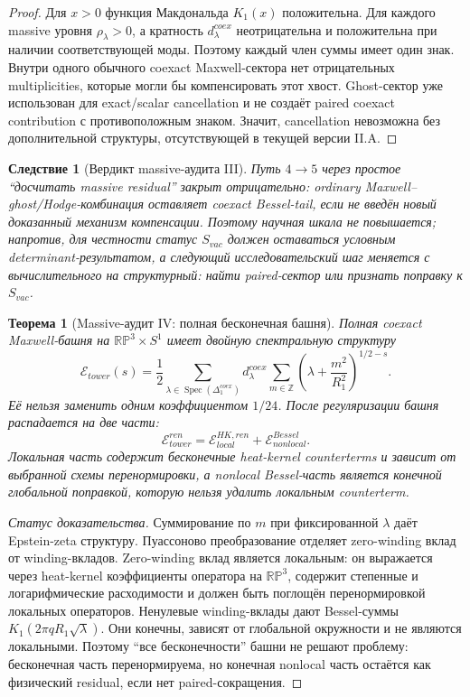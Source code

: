 \documentclass[12pt,a4paper]{report}
\newtheorem{theorem}{Теорема}[chapter]
\newtheorem{corollary}{Следствие}[chapter]
\theoremstyle{remark}
\DeclareMathOperator{\Spec}{Spec}
\begin{document}
\begin{proof}
Для \(x>0\) функция Макдональда \(K_1(x)\) положительна. Для каждого massive уровня \(\rho_{\lambda}>0\), а кратность \(d^{coex}_{\lambda}\) неотрицательна и положительна при наличии соответствующей моды. Поэтому каждый член суммы имеет один знак. Внутри одного обычного coexact Maxwell-сектора нет отрицательных multiplicities, которые могли бы компенсировать этот хвост. Ghost-сектор уже использован для exact/scalar cancellation и не создаёт paired coexact contribution с противоположным знаком. Значит, cancellation невозможна без дополнительной структуры, отсутствующей в текущей версии II.A.
\end{proof}

\begin{corollary}[Вердикт massive-аудита III]
Путь \(4\to5\) через простое ``досчитать massive residual'' закрыт отрицательно: ordinary Maxwell--ghost/Hodge-комбинация оставляет coexact Bessel-tail, если не введён новый доказанный механизм компенсации. Поэтому научная шкала не повышается; напротив, для честности статус \(S_{vac}\) должен оставаться условным determinant-результатом, а следующий исследовательский шаг меняется с вычислительного на структурный: найти paired-сектор или признать поправку к \(S_{vac}\).
\end{corollary}


\begin{theorem}[Massive-аудит IV: полная бесконечная башня]
Полная coexact Maxwell-башня на \(\mathbb{RP}^3\times S^1\) имеет двойную спектральную структуру
\begin{equation}
    \mathcal{E}_{tower}(s)=
    \frac12\sum_{\lambda\in\Spec(\Delta_1^{coex})}
    d^{coex}_{\lambda}
    \sum_{m\in\mathbb{Z}}
    \left(\lambda+\frac{m^2}{R_1^2}\right)^{1/2-s}.
\end{equation}
Её нельзя заменить одним коэффициентом \(1/24\). После регуляризации башня распадается на две части:
\begin{equation}
    \mathcal{E}_{tower}^{ren}
    =\mathcal{E}_{local}^{HK,ren}
    +\mathcal{E}_{nonlocal}^{Bessel}.
\end{equation}
Локальная часть содержит бесконечные heat-kernel counterterms и зависит от выбранной схемы перенормировки, а nonlocal Bessel-часть является конечной глобальной поправкой, которую нельзя удалить локальным counterterm.
\end{theorem}

\begin{proof}[Статус доказательства]
Суммирование по \(m\) при фиксированной \(\lambda\) даёт Epstein-zeta структуру. Пуассоново преобразование отделяет zero-winding вклад от winding-вкладов. Zero-winding вклад является локальным: он выражается через heat-kernel коэффициенты оператора на \(\mathbb{RP}^3\), содержит степенные и логарифмические расходимости и должен быть поглощён перенормировкой локальных операторов. Ненулевые winding-вклады дают Bessel-суммы \(K_1(2\pi qR_1\sqrt{\lambda})\). Они конечны, зависят от глобальной окружности и не являются локальными. Поэтому ``все бесконечности'' башни не решают проблему: бесконечная часть перенормируема, но конечная nonlocal часть остаётся как физический residual, если нет paired-сокращения.
\end{proof}
\end{document}
